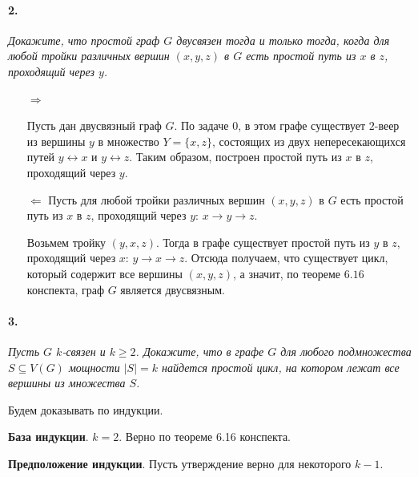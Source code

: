 \documentclass[russian]{article}
\begin{document}
\paragraph{2.} \textit{Докажите, что простой граф $G$ двусвязен тогда и только тогда, когда для любой тройки различных вершин $(x, y, z)$ в $G$ есть простой путь из $x$ в $z$, проходящий через $y$.}

\begin{itemize}
\item[$\Rightarrow$]

Пусть дан двусвязный граф $G$. По задаче $0$, в этом графе существует $2$-веер из вершины $y$ в множество $Y = \{x, z\}$, состоящих из двух непересекающихся путей $y \leftrightarrow x$ и $y \leftrightarrow z$. Таким образом, построен простой путь из $x$ в $z$, проходящий через $y$.

\item[$\Leftarrow$] Пусть для любой тройки различных вершин $(x, y, z)$ в $G$ есть простой путь из $x$ в $z$, проходящий через $y$: $x \rightarrow y \rightarrow z$.

Возьмем тройку $(y, x, z)$. Тогда в графе существует простой путь из $y$ в $z$, проходящий через $x$: $y \rightarrow x \rightarrow z$. Отсюда получаем, что существует цикл, который содержит все вершины $(x, y, z)$, а значит, по теореме $6.16$ конспекта, граф $G$ является двусвязным.

\end{itemize}

\paragraph{3.} \textit{Пусть $G$ $k$-связен и $k \geqslant2$. Докажите, что в графе $G$ для любого подмножества $S \subseteq V(G)$ мощности $|S| = k$ найдется простой цикл, на котором лежат все вершины из множества $S$.}

Будем доказывать по индукции.

\textbf{База индукции}. $k=2$. Верно по теореме 6.16 конспекта.

\textbf{Предположение индукции}. Пусть утверждение верно для некоторого $k-1$.
\end{document}
